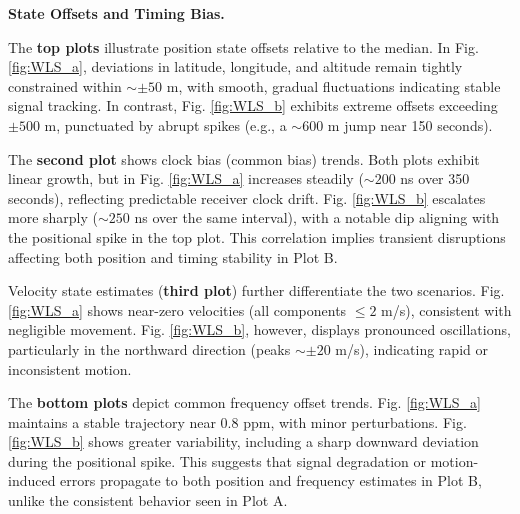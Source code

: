         \vspace{0.5em}
        \noindent \textbf{State Offsets and Timing Bias.}
        
        \noindent The \textbf{top plots} illustrate position state offsets relative to the median. 
        In Fig. \ref{fig:WLS_a}, deviations in latitude, longitude, and altitude remain tightly constrained within $\sim \pm 50$ m, with smooth, gradual fluctuations indicating stable signal tracking. 
        In contrast, Fig. \ref{fig:WLS_b} exhibits extreme offsets exceeding $\pm 500$ m, punctuated by abrupt spikes (e.g., a $\sim 600$ m jump near 150 seconds).  

        \noindent The \textbf{second plot} shows clock bias (common bias) trends. 
        Both plots exhibit linear growth, but in Fig. \ref{fig:WLS_a} increases steadily ($\sim 200$ ns over 350 seconds), reflecting predictable receiver clock drift. 
        Fig. \ref{fig:WLS_b} escalates more sharply ($\sim 250$ ns over the same interval), with a notable dip aligning with the positional spike in the top plot. 
        This correlation implies transient disruptions affecting both position and timing stability in Plot B.  

        \noindent Velocity state estimates (\textbf{third plot}) further differentiate the two scenarios. 
        Fig. \ref{fig:WLS_a} shows near-zero velocities (all components $\leq 2$ m/s), consistent with negligible movement. 
        Fig. \ref{fig:WLS_b}, however, displays pronounced oscillations, particularly in the northward direction (peaks $\sim \pm 20$ m/s), indicating rapid or inconsistent motion.  

        \noindent The \textbf{bottom plots} depict common frequency offset trends. 
        Fig. \ref{fig:WLS_a} maintains a stable trajectory near $0.8$ ppm, with minor perturbations. 
        Fig. \ref{fig:WLS_b} shows greater variability, including a sharp downward deviation during the positional spike. 
        This suggests that signal degradation or motion-induced errors propagate to both position and frequency estimates in Plot B, unlike the consistent behavior seen in Plot A.  

        \vspace{-0.2em}

